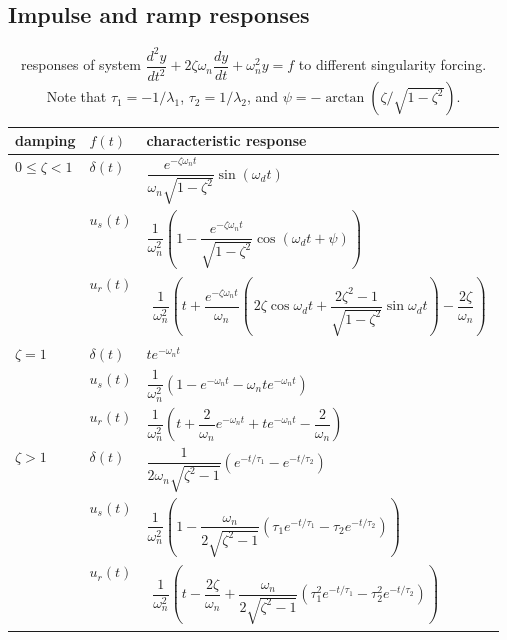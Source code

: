 \documentclass[dynamic_systems.tex]{subfiles}
\begin{document}
\subsection{Impulse and ramp responses}

\begin{table}
\caption{responses of system $\dfrac{d^2 y}{dt^2} + 2 \zeta \omega_n \dfrac{d y}{dt} + \omega_n^2 y = f$ to different singularity forcing. Note that $\tau_1 = -1/\lambda_1$, $\tau_2 = 1/\lambda_2$, and $\psi = -\arctan(\zeta/\sqrt{1-\zeta^2})$.}
\begingroup
\def\mystrut{\rule[-2ex]{0ex}{6ex}}
\begin{adjustbox}{center}
\begin{tabular}{l l l}
	\toprule
	damping	& $f(t)$		& characteristic response \\ \midrule
	\mystrut $0 \le \zeta < 1$ & 
	$\delta(t)$	& 
	$\dfrac{e^{-\zeta \omega_n t}}{\omega_n \sqrt{1-\zeta^2}} \sin (\omega_d t)$ \\
	\mystrut &
	$u_s(t)$		& 
	$\dfrac{1}{\omega_n^2} \left ( 1 - \dfrac{e^{-\zeta \omega_n t}}{\sqrt{1-\zeta^2}} \cos (\omega_d t + \psi) \right ) $ \\
	\mystrut & 
	$u_r(t)$		
	& 
	$\begin{aligned} 
	\dfrac{1}{\omega_n^2} \left ( 
		t + \dfrac{e^{-\zeta \omega_n t}}{\omega_n} \left ( 
			\dfrac{}{} 2\zeta \cos \omega_d t + \dfrac{2\zeta^2 - 1}{\sqrt{1-\zeta^2}} \sin \omega_d t 
		\right ) - \dfrac{2 \zeta}{\omega_n} 
	\right )  
	\end{aligned}$ 
	\\
	\mystrut $\zeta = 1$	& $\delta(t)$	& $t e^{-\omega_n t}$  \\
	\mystrut & $u_s(t)$		& $\dfrac{1}{\omega_n^2} \left ( 1 - e^{-\omega_n t} - \omega_n t e^{-\omega_n t} \right )$ \\
	\mystrut & $u_r(t)$		& $\dfrac{1}{\omega_n^2} \left ( t + \dfrac{2}{\omega_n} e^{-\omega_n t} + t e^{-\omega_n t} - \dfrac{2}{\omega_n} \right )$ \\
	\mystrut $\zeta > 1$	& $\delta(t)$	& $\dfrac{1}{2 \omega_n \sqrt{\zeta^2 - 1}} \left ( e^{-t/\tau_1} - e^{-t/\tau_2} \right )$ \\
	\mystrut & $u_s(t)$		& $\dfrac{1}{\omega_n^2} \left ( 1 - \dfrac{\omega_n}{2 \sqrt{\zeta^2 - 1}} \left ( \tau_1 e^{-t/\tau_1} - \tau_2 e^{-t/\tau_2} \right ) \right )$ \\
	\mystrut &
	$u_r(t)$ & 
	$\begin{aligned} 
		\dfrac{1}{\omega_n^2} \left ( t - \dfrac{2 \zeta}{\omega_n}  + \dfrac{\omega_n}{2 \sqrt{\zeta^2 - 1}} \left ( \tau_1^2 e^{-t/\tau_1} - \tau_2^2 e^{-t/\tau_2} \right ) \right ) \nonumber 
	\end{aligned}$ 
	\\
	\bottomrule
\end{tabular}
\end{adjustbox}
\endgroup
\label{tab:forced_response_second_order}
\end{table}
\end{document}
